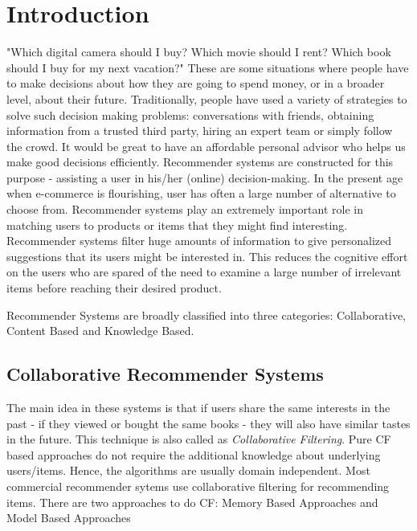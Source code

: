 
\chapter{Introduction}
\label{chap:intro}
"Which digital camera should I buy? Which movie should I rent? Which book should I buy for my next vacation?" These are some situations where people have to make decisions about how they are going to spend money, or in a broader level, about their future.
Traditionally, people have used a variety of strategies to solve such decision making problems: conversations with friends, obtaining information from a trusted third party, hiring an expert team or simply follow the crowd. It would be great to have an affordable personal advisor who helps us make good decisions efficiently.
Recommender systems are constructed for this purpose - assisting a user in his/her (online) decision-making.
In the present age when e-commerce is flourishing, user has often a large number of alternative to choose from. 
Recommender systems play an extremely important role in matching users to products or items that they might find interesting. 
Recommender systems filter huge amounts of information to give personalized suggestions that its users might be interested in. 
This reduces the cognitive effort on the users who are spared of the need to examine a large number of irrelevant items before reaching their desired product.

Recommender Systems are broadly classified into three categories: Collaborative, Content Based and Knowledge Based.

\section{Collaborative Recommender Systems}
 The main idea in these systems is that if users share the same interests in the past - if they viewed or bought the same books - they will also have similar tastes in the future. This technique is also called as \textit{Collaborative Filtering}. Pure CF based approaches do not require the additional knowledge about underlying users/items. Hence, the algorithms are usually domain independent. Most commercial recommender sytems use collaborative filtering for recommending items.
There are two approaches to do CF: Memory Based Approaches and Model Based Approaches

